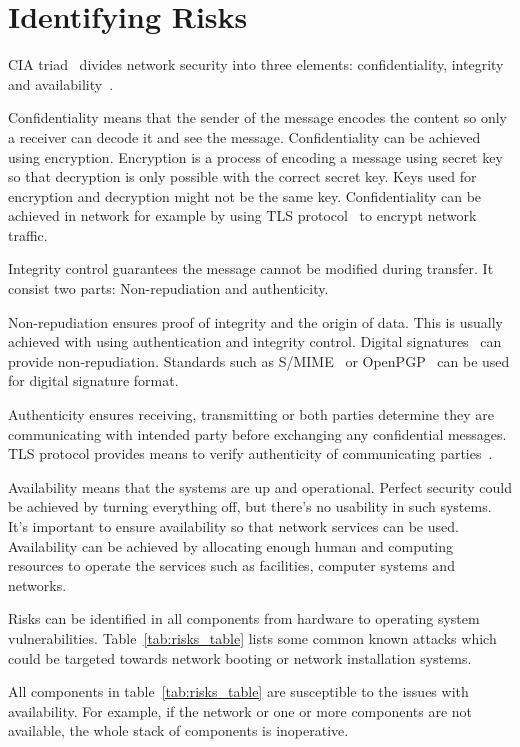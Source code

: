\section{Identifying Risks}

CIA triad~\cite{cia-triad} divides network security into three
elements: confidentiality, integrity and availability~\cite{anderson}.

Confidentiality means that the sender of the message encodes the
content so only a receiver can decode it and see the
message. Confidentiality can be achieved using encryption. Encryption
is a process of encoding a message using secret key so that decryption
is only possible with the correct secret key. Keys used for encryption
and decryption might not be the same key. Confidentiality can be
achieved in network for example by using TLS protocol~\cite{RFC5246}
to encrypt network traffic.

Integrity control guarantees the message cannot be modified during
transfer. It consist two parts: Non-repudiation and authenticity.

Non-repudiation ensures proof of integrity and the origin of
data. This is usually achieved with using authentication and integrity
control. Digital signatures~\cite{Diffie2006}\cite{Goldwasser1988} can
provide non-repudiation. Standards such as S/MIME~\cite{RFC5751} or
OpenPGP~\cite{RFC4880} can be used for digital signature format.

Authenticity ensures receiving, transmitting or both parties determine
they are communicating with intended party before exchanging any
confidential messages. TLS protocol provides means to verify
authenticity of communicating parties~\cite{RFC5246}.

Availability means that the systems are up and operational. Perfect
security could be achieved by turning everything off, but there's no
usability in such systems. It's important to ensure availability so
that network services can be used. Availability can be achieved by
allocating enough human and computing resources to operate the
services such as facilities, computer systems and networks.

Risks can be identified in all components from hardware to operating
system vulnerabilities. Table~\ref{tab:risks_table} lists some
common known attacks which could be targeted towards network booting
or network installation systems.

All components in table~\ref{tab:risks_table} are susceptible to the
issues with availability. For example, if the network or one or more
components are not available, the whole stack of components is
inoperative.

